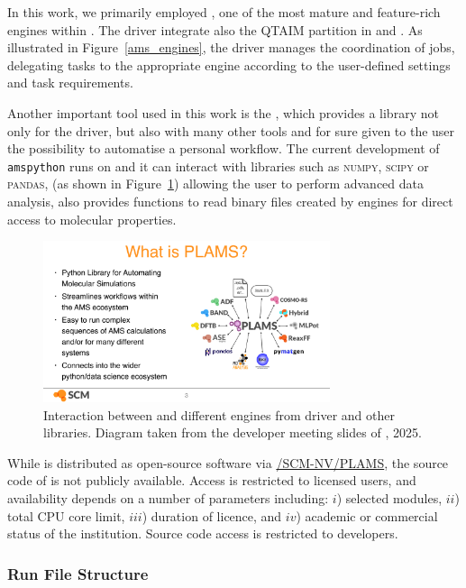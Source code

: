 \newpage
In this work, we primarily employed \adf, one of the most mature and
feature-rich engines within \ams. The \ams driver integrate also the QTAIM
partition in \band and \dftb.  As illustrated in Figure~\ref{ams_engines}, the
\ams driver manages the coordination of jobs, delegating tasks to the
appropriate engine according to the user-defined settings and task
requirements.

Another important tool used in this work is the \plams, which provides a
\python library not only for the \ams driver, but also with many other tools
and for sure given to the user the possibility to automatise a personal
workflow. The current development of \texttt{amspython} runs on  and
it can interact with libraries such as \textsc{numpy}, \textsc{scipy} or
\textsc{pandas}, (as shown in Figure~\ref{plams_diagram}) allowing the user to
perform advanced data analysis, \plams also provides functions to read binary
files created by \ams engines for direct access to molecular properties.

\begin{figure}[h]
  \centering
  \includegraphics[width=0.75\textwidth]{img/plams_diagram}
  \caption{Interaction between \plams and different engines from \ams driver and
           other libraries. Diagram taken from the developer meeting slides of
           \scm, 2025.}
  \label{plams_diagram}
\end{figure}

While \plams is distributed as open-source software via
\href{http://www.github.com/SCM-NV/PLAMS}{\faGithub/SCM-NV/PLAMS}, the source
code of \ams is not publicly available. Access is restricted to licensed users,
and availability depends on a number of parameters including: $i$) selected
modules, $ii$) total CPU core limit, $iii$) duration of licence, and $iv$)
academic or commercial status of the institution. Source code access is
restricted to developers.

\newpage
\subsubsection{Run File Structure}

